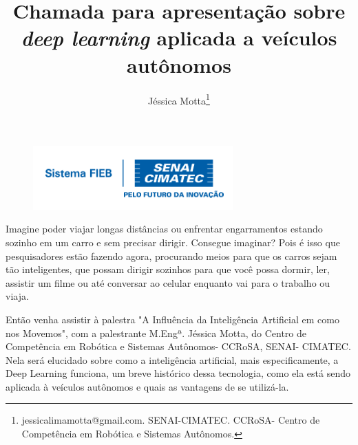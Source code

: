 \documentclass[12pt,a4paper]{article}
\begin{document}
 
\begin{figure}
    \flushright
    \includegraphics[scale=0.5]{Logo_senai.png}
\end{figure}

\title{Chamada para apresentação sobre \emph{deep learning} aplicada a veículos autônomos}
\author{Jéssica Motta\thanks{jessicalimamotta@gmail.com. SENAI-CIMATEC. CCRoSA- Centro de Competência em Robótica e Sistemas Autônomos.}}
 

    \maketitle
    \singlespacing


Imagine poder viajar longas distâncias ou enfrentar engarramentos estando sozinho em um carro e sem precisar dirigir. Consegue imaginar? Pois é isso que pesquisadores estão fazendo agora, procurando meios para que os carros sejam tão inteligentes, que possam dirigir sozinhos para que você possa dormir, ler, assistir um filme ou até conversar ao celular enquanto vai para o trabalho ou viaja.

Então venha assistir à palestra "A Influência da Inteligência Artificial em como nos Movemos", com a palestrante M.Engª. Jéssica Motta, do Centro de Competência em Robótica e Sistemas Autônomos- CCRoSA, SENAI- CIMATEC. Nela será elucidado sobre como a inteligência artificial, mais especificamente, a Deep Learning funciona, um breve histórico dessa tecnologia, como ela está sendo aplicada à veículos autônomos e quais as vantagens de se utilizá-la.
\end{document}

